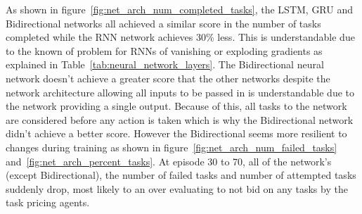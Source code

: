As shown in figure~\ref{fig:net_arch_num_completed_tasks}, the LSTM, GRU and Bidirectional networks all achieved a
similar score in the number of tasks completed while the RNN network achieves 30\% less. This is understandable due to
the known of problem for RNNs of vanishing or exploding gradients as explained in Table~\ref{tab:neural_network_layers}.
The Bidirectional neural network doesn't achieve a greater score that the other networks despite the network
architecture allowing all inputs to be passed in is understandable due to the network providing a single output.
Because of this, all tasks to the network are considered before any action is taken which is why the Bidirectional
network didn't achieve a better score. However the Bidirectional seems more resilient to changes during training as
shown in figure~\ref{fig:net_arch_num_failed_tasks} and~\ref{fig:net_arch_percent_tasks}. At episode 30 to 70, all
of the network's (except Bidirectional), the number of failed tasks and number of attempted tasks suddenly drop, most
likely to an over evaluating to not bid on any tasks by the task pricing agents.

